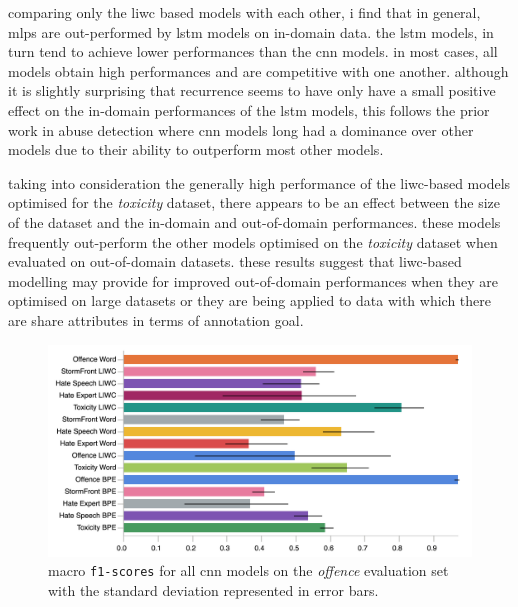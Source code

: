 comparing only the liwc based models with each other, i find that in general, mlps are out-performed by lstm models on in-domain data.
the lstm models, in turn tend to achieve lower performances than the cnn models.
in most cases, all models obtain high performances and are competitive with one another.
although it is slightly surprising that recurrence seems to have only have a small positive effect on the in-domain performances of the lstm models, this follows the prior work in abuse detection where cnn models long had a dominance over other models due to their ability to outperform most other models.

taking into consideration the generally high performance of the liwc-based models optimised for the \textit{toxicity} dataset, there appears to be an effect between the size of the dataset and the in-domain and out-of-domain performances.
these models frequently out-perform the other models optimised on the \textit{toxicity} dataset when evaluated on out-of-domain datasets.
these results suggest that liwc-based modelling may provide for improved out-of-domain performances when they are optimised on large datasets or they are being applied to data with which there are share attributes in terms of annotation goal.

\begin{figure}
\centering
    \includegraphics[width=\textwidth]{all_cnn_davidson_test.pdf}
    \caption{macro \texttt{f1-scores} for all cnn models on the \textit{offence} evaluation set with the standard deviation represented in error bars.}
    \label{fig:davidson_cnn_test}
\end{figure}

